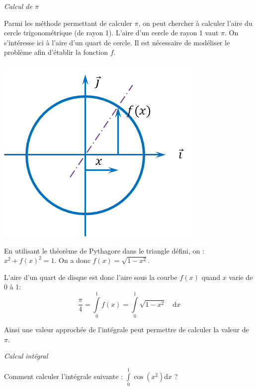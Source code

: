 \documentclass[11pt]{article}
\begin{document}
\begin{exemple}
\textit{Calcul de $\pi$}

\begin{minipage}[c]{.6\linewidth}
Parmi les méthode permettant de calculer $\pi$, on peut chercher à calculer l'aire du cercle trigonométrique (de rayon 1). L'aire d'un cercle de rayon 1 vaut $\pi$. On s'intéresse ici à l'aire d'un quart de cercle. Il est nécessaire de modéliser le problème afin d'établir la fonction $f$.

\end{minipage}\hfill
\begin{minipage}[c]{.35\linewidth}
\begin{center}
\includegraphics[width=.95\textwidth]{images/cercle}
\end{center}
\end{minipage}

En utilisant le théorème de Pythagore dans le triangle défini, on : $x^2 + f(x)^2 = 1$. On a donc $f(x)=\sqrt{1-x^2}$. 

L'aire d'un quart de disque est donc l'aire sous la courbe $f(x)$ quand $x$ varie de 0 à 1:
$$
\dfrac{\pi}{4}=\int\limits_{0}^1 f(x) =\int\limits_{0}^1\sqrt{1-x^2} \quad \mathrm{d} x
$$

Ainsi une valeur approchée de l'intégrale peut permettre de calculer la valeur de $\pi$.
\end{exemple}
 
\begin{exemple}
\textit{Calcul intégral}

Comment calculer l'intégrale suivante : $\int\limits_{0}^1 \cos \left(x^2\right) \mathrm{d} x$ ?
\end{exemple}
\end{document}
